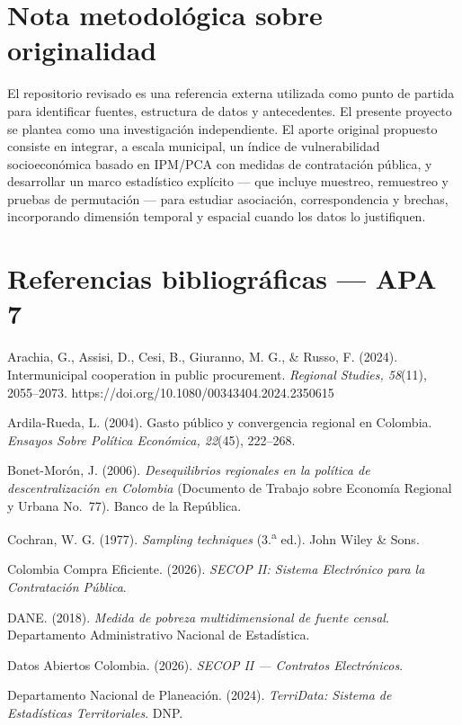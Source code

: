 \documentclass[11pt,letterpaper]{article}
\begin{document}
\section{Nota metodológica sobre originalidad}

El repositorio revisado es una referencia externa utilizada como punto de
partida para identificar fuentes, estructura de datos y antecedentes. El
presente proyecto se plantea como una investigación independiente. El aporte
original propuesto consiste en integrar, a escala municipal, un índice de
vulnerabilidad socioeconómica basado en IPM/PCA con medidas de contratación
pública, y desarrollar un marco estadístico explícito --- que incluye
muestreo, remuestreo y pruebas de permutación --- para estudiar asociación,
correspondencia y brechas, incorporando dimensión temporal y espacial cuando
los datos lo justifiquen.

\section{Referencias bibliográficas --- APA 7}

Arachia, G., Assisi, D., Cesi, B., Giuranno, M. G., \& Russo, F. (2024).
Intermunicipal cooperation in public procurement. \textit{Regional Studies,
58}(11), 2055--2073. https://doi.org/10.1080/00343404.2024.2350615

Ardila-Rueda, L. (2004). Gasto público y convergencia regional en Colombia.
\textit{Ensayos Sobre Política Económica, 22}(45), 222--268.

Bonet-Morón, J. (2006). \textit{Desequilibrios regionales en la política de
descentralización en Colombia} (Documento de Trabajo sobre Economía Regional y
Urbana No.\ 77). Banco de la República.

Cochran, W. G. (1977). \textit{Sampling techniques} (3.\textsuperscript{a}
ed.). John Wiley \& Sons.

Colombia Compra Eficiente. (2026). \textit{SECOP II: Sistema Electrónico para
la Contratación Pública}.

DANE. (2018). \textit{Medida de pobreza multidimensional de fuente censal}.
Departamento Administrativo Nacional de Estadística.

Datos Abiertos Colombia. (2026). \textit{SECOP II --- Contratos Electrónicos}.

Departamento Nacional de Planeación. (2024). \textit{TerriData: Sistema de
Estadísticas Territoriales}. DNP.
\end{document}
